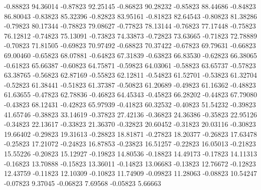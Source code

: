      -0.88823     94.36014    
     -0.87823     92.25145    
     -0.86823     90.28232    
     -0.85823     88.44686    
     -0.84823     86.80043    
     -0.83823     85.32396    
     -0.82823     83.95161    
     -0.81823     82.64543    
     -0.80823     81.38286    
     -0.79823     80.17344    
     -0.78823     79.08627    
     -0.77823     78.13144    
     -0.76823     77.17448    
     -0.75823     76.12812    
     -0.74823     75.13091    
     -0.73823     74.33873    
     -0.72823     73.63665    
     -0.71823     72.78889    
     -0.70823     71.81505    
     -0.69823     70.97492    
     -0.68823     70.37422    
     -0.67823     69.79631    
     -0.66823     69.00460    
     -0.65823     68.07881    
     -0.64823     67.31839    
     -0.63823     66.83530    
     -0.62823     66.38065    
     -0.61823     65.66387    
     -0.60823     64.75871    
     -0.59823     64.03061    
     -0.58823     63.65737    
     -0.57823     63.38765    
     -0.56823     62.87169    
     -0.55823     62.12811    
     -0.54823     61.52701    
     -0.53823     61.32704    
     -0.52823     61.38441    
     -0.51823     61.37387    
     -0.50823     61.20689    
     -0.49823     61.16362    
     -0.48823     61.63655    
     -0.47823     62.78836    
     -0.46823     64.45343    
     -0.45823     66.28202    
     -0.44823     67.79080    
     -0.43823     68.12431    
     -0.42823     65.97939    
     -0.41823     60.32532    
     -0.40823     51.54232    
     -0.39823     41.65746    
     -0.38823     33.14619    
     -0.37823     27.42136    
     -0.36823     24.36386    
     -0.35823     22.95126    
     -0.34823     22.13617    
     -0.33823     21.36370    
     -0.32823     20.60452    
     -0.31823     20.03116    
     -0.30823     19.66402    
     -0.29823     19.31613    
     -0.28823     18.81871    
     -0.27823     18.20377    
     -0.26823     17.63478    
     -0.25823     17.21072    
     -0.24823     16.87853    
     -0.23823     16.51257    
     -0.22823     16.05013    
     -0.21823     15.55226    
     -0.20823     15.12927    
     -0.19823     14.80536    
     -0.18823     14.49173    
     -0.17823     14.11313    
     -0.16823     13.70888    
     -0.15823     13.36011    
     -0.14823     13.06683    
     -0.13823     12.76672    
     -0.12823     12.43759    
     -0.11823     12.10309    
     -0.10823     11.74909    
     -0.09823     11.28063    
     -0.08823     10.54247    
     -0.07823      9.37045    
     -0.06823      7.69568    
     -0.05823      5.66663    
